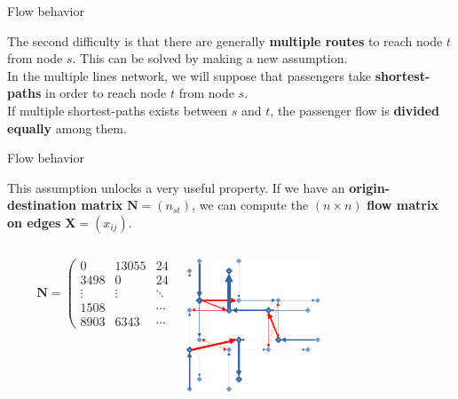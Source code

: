 \documentclass[10pt]{beamer}
\newcommand{\imp}[1]{\textbf{\color{cyan}#1}}
\begin{document}
	
	\begin{frame}{Flow behavior}
		
		The second difficulty is that there are generally \imp{multiple routes} to reach node $t$ from node $s$. This can be solved by making a new assumption. \\
		\vspace{0.4cm}
		In the multiple lines network, we will suppose that passengers take \imp{shortest-paths} in order to reach node $t$ from node $s$. \\
		\vspace{0.4cm}
		If multiple shortest-paths exists between $s$ and $t$, the passenger flow is \imp{divided equally} among them.
		
	\end{frame}
	
	
	\begin{frame}{Flow behavior}
		
		This assumption unlocks a very useful property. If we have an \imp{origin-destination matrix} $\mathbf{N} = (n_{st})$, we can compute the $(n \times n)$ \imp{flow matrix on edges} $\mathbf{X} = (x_{ij})$. \\
		\vspace{0.6cm}
		\begin{columns}
			\small
			\begin{column}{0.7\textwidth}
				$$
					\hspace{1cm} \mathbf{N} = \left( \begin{array}{ccccc}
					0 & 13055 & 243 & \cdots & 144 \\
					3498 & 0 & 24429 & \cdots & 7523 \\
					\vdots & \vdots & \ddots & \ddots & \vdots \\
					1508 &  & \cdots & 0 & 5093 \\
					8903 & 6343 & \cdots & 53 & 0 
					\end{array} \right) \rightarrow 
				$$ 
			\end{column}
			\begin{column}{0.6\textwidth}
				\hspace{0.5cm} \includegraphics[width=0.5\textwidth]{img/flow_computed.png}
			\end{column}
		\end{columns}
	\end{frame}
	
\end{document}
